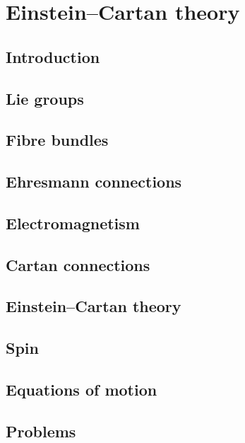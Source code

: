 \chapter{Einstein--Cartan theory}

\section{Introduction}

\section{Lie groups}

\section{Fibre bundles}

\section{Ehresmann connections}

\section{Electromagnetism}

\section{Cartan connections}

\section{Einstein--Cartan theory}

\section{Spin}

\section{Equations of motion}

\section{Problems}


